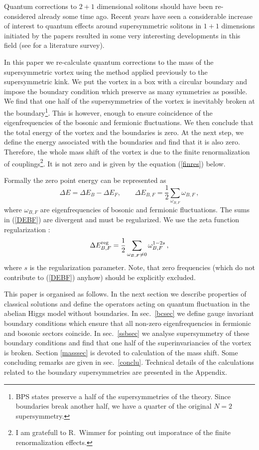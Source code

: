 \documentclass[a4paper,12pt]{article}
\begin{document}
Quantum corrections to $2+1$ dimensional solitons
should have been re-considered already some time ago. Recent
years have seen a considerable increase of interest to quantum
effects around supersymmetric solitons in $1+1$ dimensions
initiated by the papers \cite{skink} resulted in some very interesting
developments in this field (see \cite{Wimmer:2001yn} for a literature
survey). 

In this paper we re-calculate quantum corrections to the mass of the
supersymmetric vortex using the method \cite{Bordag:2002dg}
applied previously to the supersymmetric kink.
We put the vortex in a box with a circular boundary and impose the
boundary condition which preserve as many symmetries as possible.
We find that one half of the supersymmetries of the vortex is
inevitably broken at the boundary\footnote{BPS states preserve a
half of the supersymmetries of the theory. Since boundaries break
another half, we have a quarter of the original $N=2$
supersymmetry.}. This is however, enough to ensure coincidence of
the eigenfrequencies of the bosonic and fermionic fluctuations. We
then conclude that the total energy of the vortex and the
boundaries is zero. At the next step, we define the energy
associated with the boundaries and find that it is also zero.
Therefore, the whole mass shift of the vortex is due to the finite
renormalization of couplings\footnote{I am gratefull to R.~Wimmer
for pointing out imporatnce of the finite renormalization effects.}. 
It is not zero and is given by the equation
(\ref{finres}) below.

Formally the zero point energy can be represented as
\begin{equation}
\Delta E=\Delta E_B - \Delta E_F,\qquad \Delta E_{B,F} = \frac 12
\sum_{\omega_{B,F}} \omega_{B,F} \,,\label{DEBF}
\end{equation}
where $\omega_{B,F}$ are eigenfrequencies of bosonic and fermionic
fluctuations. The sums in (\ref{DEBF}) are divergent and must be
regularized. We use the zeta function regularization \cite{zfun}:
\begin{equation}
\Delta E^{\rm reg}_{B,F}=\frac 12 \sum_{\omega_{B,F}\ne 0} \omega_{B,F}^{1-2s}
\,,
\label{DEreg}
\end{equation}
where $s$ is the regularization parameter. Note, that zero frequencies
(which do not contribute to (\ref{DEBF}) anyhow) should be explicitly 
excluded.

This paper is organised as follows. 
In the next section we describe properties of classical solutions
and define the operators acting on quantum fluctuation in the
abelian Higgs model without boundaries. In sec.\ \ref{bcsec} we
define gauge invariant boundary conditions which ensure that all
non-zero eigenfrequencies in fermionic and bosonic sectors
coincide. In sec.\ \ref{ssbsec} we analyse supersymmetry of these
boundary conditions and find that one half of the
superinvariancies of the vortex is broken. Section \ref{masssec} is
devoted to calculation of the mass shift. Some concluding remarks
are given in sec.\ \ref{conclu}. Technical details of the
calculations related to the boundary supersymmetries are presented
in the Appendix.
\end{document}
